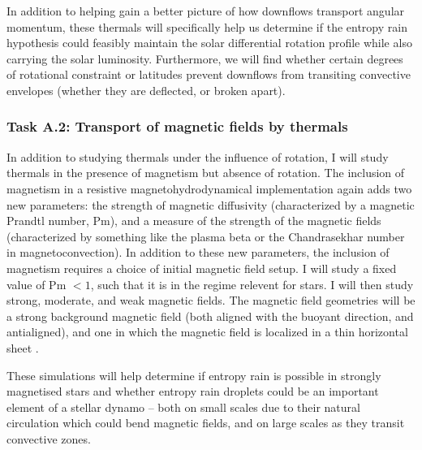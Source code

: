 \documentclass[aasms,12pt]{article}
\begin{document}
In addition to helping gain a better picture of how downflows transport angular momentum, these thermals will specifically help us determine if the entropy rain hypothesis could feasibly maintain the solar differential rotation profile while also carrying the solar luminosity.
Furthermore, we will find whether certain degrees of rotational constraint or latitudes prevent downflows from transiting convective envelopes (whether they are deflected, or broken apart).

\subsubsection{Task A.2: Transport of magnetic fields by thermals}
In addition to studying thermals under the influence of rotation, I will study thermals in the presence of magnetism but absence of rotation.
The inclusion of magnetism in a resistive magnetohydrodynamical implementation again adds two new parameters: the strength of magnetic diffusivity (characterized by a magnetic Prandtl number, Pm), and a measure of the strength of the magnetic fields (characterized by something like the plasma beta or the Chandrasekhar number in magnetoconvection).
In addition to these new parameters, the inclusion of magnetism requires a choice of initial magnetic field setup.
I will study a fixed value of Pm $< 1$, such that it is in the regime relevent for stars.
I will then study strong, moderate, and weak magnetic fields.
The magnetic field geometries will be a strong background magnetic field (both aligned with the buoyant direction, and antialigned), and one in which the magnetic field is localized in a thin horizontal sheet \citep[as in][]{tobias&all1998}.

These simulations will help determine if entropy rain is possible in strongly magnetised stars and whether entropy rain droplets could be an important element of a stellar dynamo -- both on small scales due to their natural circulation which could bend magnetic fields, and on large scales as they transit convective zones.
\end{document}
